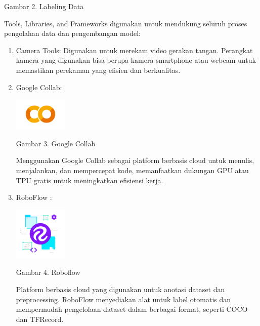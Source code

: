 \documentclass[12pt,a4paper]{article}
\begin{document}
\begin{center}
    Gambar 2. Labeling Data
\end{center}

Tools, Libraries, and Frameworks digunakan untuk mendukung seluruh proses pengolahan data dan pengembangan model:
\begin{enumerate}
    \item Camera Tools: Digunakan untuk merekam video gerakan tangan. Perangkat kamera yang digunakan bisa berupa kamera smartphone atau webcam untuk memastikan perekaman yang efisien dan berkualitas.
    \item Google Collab: 
    \begin{center}
        \includegraphics[width=0.2\textwidth]{images/3.png}
    \end{center}

    \begin{center}
        Gambar 3. Google Collab
    \end{center}
    Menggunakan Google Collab sebagai platform berbasis cloud untuk menulis, menjalankan, dan mempercepat kode, memanfaatkan dukungan GPU atau TPU gratis untuk meningkatkan efisiensi kerja.

    \item RoboFlow :
    \begin{center}
        \includegraphics[width=0.2\textwidth]{images/4.png}
    \end{center}

    \begin{center}
        Gambar 4. Roboflow
    \end{center}
    Platform berbasis cloud yang digunakan untuk anotasi dataset dan preprocessing. RoboFlow menyediakan alat untuk label otomatis dan mempermudah pengelolaan dataset dalam berbagai format, seperti COCO dan TFRecord.


\end{enumerate}
\end{document}
